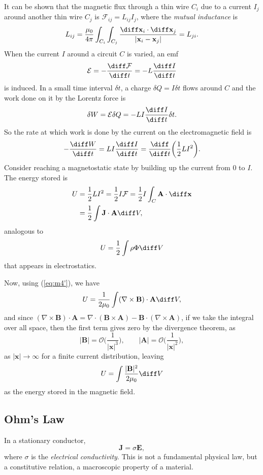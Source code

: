 \documentclass[12pt]{article}
\begin{document}
It can be shown that the magnetic flux through a thin wire $C_i$ due to a current $I_j$ around another thin wire $C_j$ is $\mathscr{F}_{ij} = L_{ij} I_j$, where the \emph{mutual inductance} is
\[
	L_{ij} = \frac{\mu_0}{4 \pi} \int_{C_i} \int_{C_j} \frac{\diff \mathbf{x}_i \cdot \diff \mathbf{x}_j}{|\mathbf{x}_i - \mathbf{x}_j|} = L_{ji}
.\]
When the current $I$ around a circuit $C$ is varied, an emf
\[
\mathcal{E} = - \frac{\diff \mathcal{F}}{\diff t} = - L \frac{\diff I}{\diff t}
\]
is induced. In a small time interval $\delta t$, a charge $\delta Q = I \delta t$ flows around $C$ and the work done on it by the Lorentz force is
\[
\delta W = \mathcal{E} \delta Q = - LI \frac{\diff I}{\diff t} \delta t
.\]
So the rate at which work is done by the current on the electromagnetic field is
\[
- \frac{\diff W}{\diff t} = LI \frac{\diff I}{\diff t} = \frac{\diff}{\diff t} \biggl( \frac{1}{2} LI^2 \biggr)
.\]
Consider reaching a magnetostatic state by building up the current from $0$ to $I$. The energy stored is
\begin{align*}
	U &= \frac{1}{2} LI^2 = \frac{1}{2} I \mathcal{F} = \frac{1}{2} I \int_{C} \mathbf{A} \cdot \diff \mathbf{x} \\
	  &= \frac{1}{2} \int \mathbf{J} \cdot \mathbf{A} \diff V,
\end{align*}
analogous to
\[
U = \frac{1}{2} \int \rho \Phi \diff V
\]
that appears in electrostatics.

Now, using (\ref{eq:m4'}), we have
\[
U = \frac{1}{2 \mu_0} \int (\nabla \times \mathbf{B}) \cdot \mathbf{A} \diff V
,\]
and since $(\nabla \times \mathbf{B}) \cdot \mathbf{A} = \nabla \cdot (\mathbf{B} \times \mathbf{A}) - \mathbf{B} \cdot (\nabla \times \mathbf{A})$, if we take the integral over all space, then the first term gives zero by the divergence theorem, as
\[
|\mathbf{B}| = \mathcal{O} \biggl( \frac{1}{|\mathbf{x}|^3} \biggr), \qquad |\mathbf{A}| = \mathcal{O} \biggl( \frac{1}{|\mathbf{x}|^2} \biggr)
,\]
as $|\mathbf{x}| \to \infty$ for a finite current distribution, leaving
\[
U = \int \frac{|\mathbf{B}|^2}{2 \mu_0} \diff V
\]
as the energy stored in the magnetic field.

\subsection{Ohm's Law}
\label{sub:ohms_law}

In a stationary conductor,
\[
\mathbf{J} = \sigma \mathbf{E}
,\]
where $\sigma$ is the \emph{electrical conductivity}. This is not a fundamental physical law, but a constitutive relation, a macroscopic property of a material.
\end{document}
